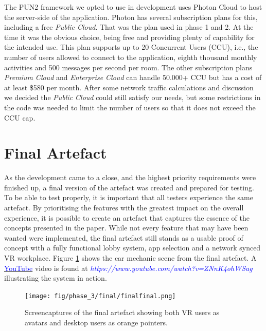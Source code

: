 The PUN2 framework we opted to use in development uses Photon Cloud to host the server-side of the application. Photon has several subscription plans for this, including a free \textit{Public Cloud}. That was the plan used in phase 1 and 2. At the time it was the obvious choice, being free and providing plenty of capability for the intended use. This plan supports up to 20 Concurrent Users (CCU), i.e., the number of users allowed to connect to the application, eighth thousand monthly activities and 500 messages per second per room. The other subscription plans \textit{Premium Cloud} and \textit{Enterprise Cloud} can handle 50.000+ CCU but has a cost of at least \$580 per month. After some network traffic calculations and discussion we decided the \textit{Public Cloud} could still satisfy our needs, but some restrictions in the code was needed to limit the number of users so that it does not exceed the CCU cap. 





\section{Final Artefact}
As the development came to a close, and the highest priority requirements were finished up, a final version of the artefact was created and prepared for testing. To be able to test properly, it is important that all testers experience the same artefact. By prioritising the features with the greatest impact on the overall experience, it is possible to create an artefact that captures the essence of the concepts presented in the paper. While not every feature that may have been wanted were implemented, the final artefact still stands as a usable proof of concept with a fully functional lobby system, app selection and a network synced VR workplace. Figure \ref{fig:finalArtefact} shows the car mechanic scene from the final artefact. A \href{https://www.youtube.com/watch?v=ZNnK4ohWSag}{\textcolor{blue}{YouTube}} video is found at \textcolor{blue}{\textit{https://www.youtube.com/watch?v=ZNnK4ohWSag}} illustrating the system in action.


\begin{figure}[]
  \centering
  \captionsetup{width=1\linewidth}
    \texttt{[image: fig/phase\_3/final/finalfinal.png]}
  \caption{Screencaptures of the final artefact showing both VR users as avatars and desktop users as orange pointers.}
  \label{fig:finalArtefact}
\end{figure}



